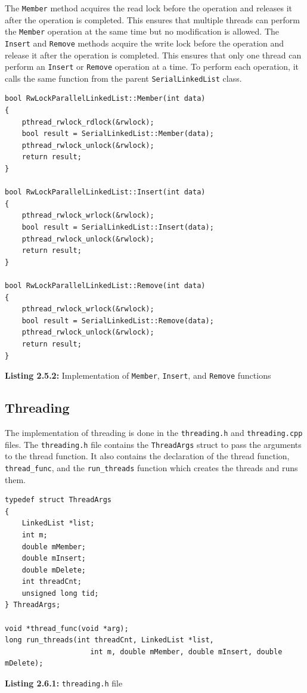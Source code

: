 \documentclass[a4paper,12pt]{article}
\begin{document}
The \lstinline|Member| method acquires the read lock before the operation and releases it after the operation is completed. This ensures that multiple threads can perform the \lstinline|Member| operation at the same time but no modification is allowed. The \lstinline|Insert| and \lstinline|Remove| methods acquire the write lock before the operation and release it after the operation is completed. This ensures that only one thread can perform an \lstinline|Insert| or \lstinline|Remove| operation at a time. To perform each operation, it calls the same function from the parent \lstinline|SerialLinkedList| class.

\begin{lstlisting}
bool RwLockParallelLinkedList::Member(int data)
{
    pthread_rwlock_rdlock(&rwlock);
    bool result = SerialLinkedList::Member(data);
    pthread_rwlock_unlock(&rwlock);
    return result;
}

bool RwLockParallelLinkedList::Insert(int data)
{
    pthread_rwlock_wrlock(&rwlock);
    bool result = SerialLinkedList::Insert(data);
    pthread_rwlock_unlock(&rwlock);
    return result;
}

bool RwLockParallelLinkedList::Remove(int data)
{
    pthread_rwlock_wrlock(&rwlock);
    bool result = SerialLinkedList::Remove(data);
    pthread_rwlock_unlock(&rwlock);
    return result;
}
\end{lstlisting}
\begin{center}
    \textbf{Listing 2.5.2:} Implementation of \lstinline|Member|, \lstinline|Insert|, and \lstinline|Remove| functions
\end{center}

\subsection{Threading}

The implementation of threading is done in the \lstinline|threading.h| and \lstinline|threading.cpp| files. The \lstinline|threading.h| file contains the \lstinline|ThreadArgs| struct to pass the arguments to the thread function. It also contains the declaration of the thread function, \lstinline|thread_func|, and the \lstinline|run_threads| function which creates the threads and runs them.

\begin{lstlisting}
typedef struct ThreadArgs
{
    LinkedList *list;
    int m;
    double mMember;
    double mInsert;
    double mDelete;
    int threadCnt;
    unsigned long tid;
} ThreadArgs;

void *thread_func(void *arg);
long run_threads(int threadCnt, LinkedList *list,
                    int m, double mMember, double mInsert, double mDelete);
\end{lstlisting}
\begin{center}
    \textbf{Listing 2.6.1:} \lstinline|threading.h| file
\end{center}
\end{document}
